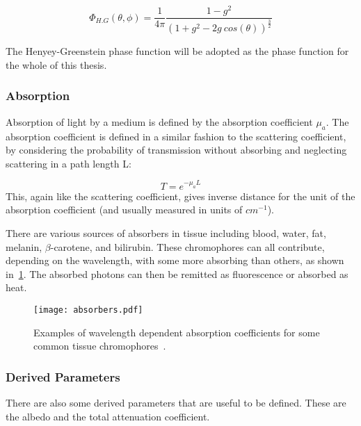 \begin{equation}
	\Phi_{H.G}(\theta,\phi)=\frac{1}{4\pi}\frac{1-g^2}{(1+g^2-2g\ cos(\theta))^{\tfrac{3}{2}}}
	\label{eqn:henyey}
\end{equation}

The Henyey-Greenstein phase function will be adopted as the phase function for the whole of this thesis.

\subsubsection*{Absorption}\label{sec:absor}

Absorption of light by a medium is defined by the absorption coefficient $\mu_a$. The absorption coefficient is defined in a similar fashion to the scattering coefficient, by considering the probability of transmission without absorbing and neglecting scattering in a path length L:

\begin{equation}
	T=e^{-\mu_aL}
\end{equation}
This, again like the scattering coefficient, gives inverse distance for the unit of the absorption coefficient (and usually measured in units of $cm^{-1}$).

There are various sources of absorbers in tissue including blood, water, fat, melanin, $\beta$-carotene, and bilirubin. These chromophores can all contribute, depending on the wavelength, with some more absorbing than others, as shown in~\cref{fig:absorb}.
The absorbed photons can then be remitted as fluorescence or absorbed as heat. 

\begin{figure}[!htbp]
	\centering
	\texttt{[image: absorbers.pdf]}
	\caption{Examples of wavelength dependent absorption coefficients for some common tissue chromophores~\cite{dixon2005photochemcad,photoprahl2017,segelstein1981complex,pope1997absorption,jacques2013optical,van2004determination,saidi1992transcutaneous,iglesias2015biophysically,bashkatov2011optical,sarna2006physical}.}
	\label{fig:absorb}
\end{figure}


\subsubsection*{Derived Parameters}

There are also some derived parameters that are useful to be defined.
These are the albedo and the total attenuation coefficient.

